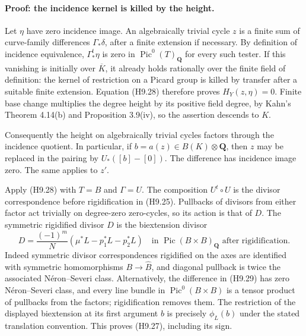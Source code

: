 \documentclass[11pt,a4paper]{article}
\begin{document}
\paragraph{Proof: the incidence kernel is killed by the height.}
Let $\eta$ have zero incidence image. An algebraically trivial cycle
$z$ is a finite sum of curve-family differences
$\Gamma_*\delta$, after a finite extension if necessary. By definition
of incidence equivalence, $\Gamma^t_*\eta$ is zero in
$\operatorname{Pic}^0(T)_{\mathbf Q}$ for every such tester. If this
vanishing is initially over $\overline K$, it already holds rationally
over the finite field of definition: the kernel of restriction on a
Picard group is killed by transfer after a suitable finite extension.
Equation (H9.28) therefore proves $H_Y(z,\eta)=0$. Finite base change
multiplies the degree height by its positive field degree, by Kahn's
Theorem 4.14(b) and Proposition 3.9(iv), so the assertion descends to
$K$.

Consequently the height on algebraically trivial cycles factors through
the incidence quotient. In particular, if $b=a(z)\in B(K)\otimes
\mathbf Q$, then $z$ may be replaced in the pairing by
$U_*([b]-[0])$. The difference has incidence image zero. The same
applies to $z'$.

Apply (H9.28) with $T=B$ and $\Gamma=U$. The composition $U^t\circ U$
is the divisor correspondence before rigidification in (H9.25).
Pullbacks of divisors from either factor act trivially on degree-zero
zero-cycles, so its action is that of $D$. The symmetric rigidified
divisor $D$ is the biextension divisor
\[
 D=\frac{(-1)^m}{N}
       (\mu^*L-p_1^*L-p_2^*L)
       \quad\text{in }\operatorname{Pic}(B\times B)_{\mathbf Q}
       \text{ after rigidification}.                        \tag{H9.29}
\]
Indeed symmetric divisor correspondences rigidified on the axes are
identified with symmetric homomorphisms $B\to\widehat B$, and
diagonal pullback is twice the associated N\'eron--Severi class.
Alternatively, the difference in (H9.29) has zero N\'eron--Severi class,
and every line bundle in $\operatorname{Pic}^0(B\times B)$ is a tensor
product of pullbacks from the factors; rigidification removes them.
The restriction of the displayed biextension at its first argument $b$
is precisely $\phi_L(b)$ under the stated translation convention.
This proves (H9.27), including its sign.
\end{document}
